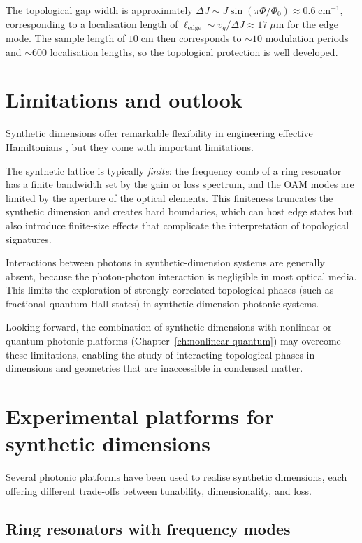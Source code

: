 The topological gap width is approximately
$\Delta J\sim J\sin(\pi\Phi/\Phi_0)\approx 0.6\;\mathrm{cm}^{-1}$,
corresponding to a localisation length of
$\ell_{\mathrm{edge}}\sim v_g/\Delta J\approx 17\;\mu\mathrm{m}$
for the edge mode.  The sample length of $10\;\mathrm{cm}$ then
corresponds to $\sim 10$ modulation periods and $\sim 600$
localisation lengths, so the topological protection is well developed.

\section{Limitations and outlook}
\label{sec:ch16-limitations}

Synthetic dimensions offer remarkable flexibility in engineering
effective Hamiltonians \cite{price2022roadmap}, but they come with
important limitations.

The synthetic lattice is typically \emph{finite}: the frequency comb of
a ring resonator has a finite bandwidth set by the gain or loss
spectrum, and the OAM modes are limited by the aperture of the optical
elements.  This finiteness truncates the synthetic dimension and creates
hard boundaries, which can host edge states but also introduce
finite-size effects that complicate the interpretation of topological
signatures.

Interactions between photons in synthetic-dimension systems are
generally absent, because the photon-photon interaction is negligible in
most optical media.  This limits the exploration of strongly correlated
topological phases (such as fractional quantum Hall states) in
synthetic-dimension photonic systems.

Looking forward, the combination of synthetic dimensions with
nonlinear or quantum photonic platforms (Chapter~\ref{ch:nonlinear-quantum})
may overcome these limitations, enabling the study of interacting
topological phases in dimensions and geometries that are inaccessible
in condensed matter.

\section{Experimental platforms for synthetic dimensions}
\label{sec:ch16-platforms-experimental}

Several photonic platforms have been used to realise synthetic
dimensions, each offering different trade-offs between tunability,
dimensionality, and loss.

\subsection{Ring resonators with frequency modes}
\label{sec:ch16-ring-freq}

